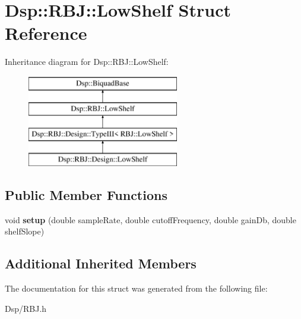 \hypertarget{structDsp_1_1RBJ_1_1LowShelf}{\section{Dsp\-:\-:R\-B\-J\-:\-:Low\-Shelf Struct Reference}
\label{structDsp_1_1RBJ_1_1LowShelf}
}
Inheritance diagram for Dsp\-:\-:R\-B\-J\-:\-:Low\-Shelf\-:\begin{figure}[H]
\begin{center}
\leavevmode
\includegraphics[height=4.000000cm]{structDsp_1_1RBJ_1_1LowShelf}
\end{center}
\end{figure}
\subsection*{Public Member Functions}
\begin{DoxyCompactItemize}
\item 
\hypertarget{structDsp_1_1RBJ_1_1LowShelf_ae8b1cd91a032bcd7ec8bca67da8335a8}{void {\bfseries setup} (double sample\-Rate, double cutoff\-Frequency, double gain\-Db, double shelf\-Slope)}\label{structDsp_1_1RBJ_1_1LowShelf_ae8b1cd91a032bcd7ec8bca67da8335a8}

\end{DoxyCompactItemize}
\subsection*{Additional Inherited Members}


The documentation for this struct was generated from the following file\-:\begin{DoxyCompactItemize}
\item 
Dsp/R\-B\-J.\-h\end{DoxyCompactItemize}
